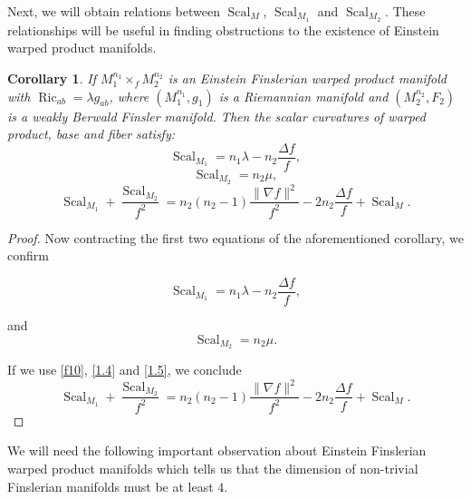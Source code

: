 \documentclass[pdflatex,sn-mathphys-num]{sn-jnl}%
\newtheorem{corollary}{Corollary}[section]
\theoremstyle{thmstyleone}%
\theoremstyle{thmstyletwo}%
\theoremstyle{thmstylethree}%
\begin{document}
\bigskip

Next, we will obtain relations between $\operatorname{Scal}_M$, $\operatorname{Scal}_{M_1}$ and $\operatorname{Scal}_{M_2}$. These relationships will be useful in finding obstructions to 
the existence of Einstein  warped product manifolds.



\vspace{0.15in}

\begin{corollary}
If $M_{1}^{n_1}\times_{f}M_{2}^{n_2}$ is an Einstein Finslerian warped product manifold with 
$\operatorname{Ric}_{ab}=\lambda g_{ab}$, 
where $(M_{1}^{n_1},g_1)$ is a Riemannian manifold and $(M_2^{n_2},F_2)$ is a weakly Berwald Finsler manifold.
Then the scalar curvatures 
 of warped product, base and fiber satisfy:
\begin{equation}\label{1.4}
			\operatorname{Scal}_{M_1}=n_1\lambda- n_2 \frac{\Delta f}{f},
		\end{equation}
 \begin{equation}\label{1.5}
			\operatorname{Scal}_{M_2}=n_2\mu,
		\end{equation}
  \begin{equation}\label{1.6}
\operatorname{Scal}_{M_1}+\dfrac{\operatorname{Scal}_{M_2}}{f^2}=n_2(n_2 -1)\dfrac{\|\nabla f\|^2}{f^2}-2n_2\frac{\Delta f}{f}+\operatorname{Scal}_M .		
	\end{equation}
    
\end{corollary}
\begin{proof}
Now contracting the first two equations of the aforementioned corollary, we confirm
		
			$$\operatorname{Scal}_{M_1}=n_1\lambda- n_2 \frac{\Delta f}{f},$$
		
	
		and	$$\operatorname{Scal}_{M_2}=n_2\mu.$$
		
	If we use  \eqref{f10},  \eqref{1.4} and \eqref{1.5}, we conclude
	\begin{equation*}
\operatorname{Scal}_{M_1}+\dfrac{\operatorname{Scal}_{M_2}}{f^2}=n_2(n_2 -1)\dfrac{\|\nabla f\|^2}{f^2}-2n_2\frac{\Delta f}{f}+\operatorname{Scal}_M .		
	\end{equation*}
	\end{proof}


		


We will need the following important observation about Einstein
Finslerian warped product manifolds which tells us that the 
dimension of non-trivial Finslerian manifolds must be at least $4$.
\end{document}
